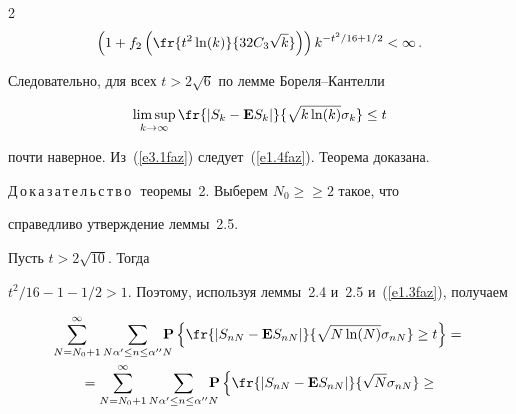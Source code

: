 \begin{multicols}{2}
\begin{multline*}
\left(1+f_2\left(\fr{t^2\ln(k)}{32C_3\sqrt{k}}\right)\right)


k^{-t^2/16 +1/2}<\infty\,.


\end{multline*}


Следовательно, для всех $t>2\sqrt{6}$  по лемме Бореля--Кантелли


\begin{equation}


\limsup_{k\to\infty}\fr{|S_{k}-{\E}S_{k}|}{\sqrt{k\ln(k)}\sigma_k}\le t


\label{e3.1faz}


\end{equation} 


почти наверное. Из~(\ref{e3.1faz}) следует~(\ref{e1.4faz}). Теорема доказана.


%





\medskip





\noindent





Д\,о\,к\,а\,з\,а\,т\,е\,л\,ь\,с\,т\,в\,о\,\ теоремы~2. Выберем $N_0\ge$\linebreak $\ge 2$ такое, что


справедливо утверждение  леммы~2.5.


 Пусть $t>2\sqrt{10}$. Тогда


${t^2}/{16}-1-{1}/{2}>1$. Поэтому, используя  леммы~2.4 и~2.5 и~(\ref{e1.3faz}), получаем





\begin{multline*}


\sum\limits_{N=N_0+1}^{\infty}\sum\limits_{N \alpha'\le n\le


\alpha^{\prime\prime}N}


\!\!\!\!\!\P\left\{\fr{|S_{nN}-{\E}S_{nN}|}{\sqrt{N\ln(N)}\sigma_{nN}}\ge


t\right\} = {}\\


{}=


\sum\limits_{N=N_0+1}^{\infty}\sum\limits_{N \alpha'\le


n\le \alpha^{\prime\prime}N}


\!\!\!\!\!\P\left\{\fr{|S_{nN}-{\E}S_{nN}|}{\sqrt{N}\sigma_{nN}}\ge\right.{}\\



\end{multline*}
\end{multicols}
